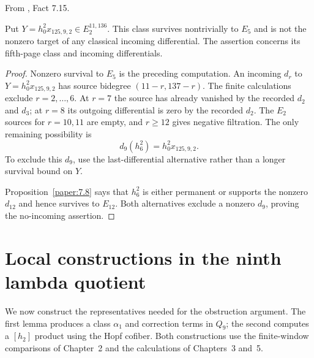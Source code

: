 \begin{fact}
\label{paper:7.15}
From \cite{LWX126}, Fact 7.15.\par

\label{fact:h_0_sq_mul_x_125_9_2}\label{fact:h02x1259}
Put $Y=h_0^2x_{125,9,2}\in E_2^{11,136}$. This class survives
nontrivially to $E_5$ and is not the nonzero target of any classical
incoming differential. The assertion concerns its fifth-page class and incoming differentials.

\end{fact}
\begin{proof}
Nonzero survival to $E_5$ is the preceding computation. An incoming $d_r$ to $Y=h_0^2x_{125,9,2}$ has source bidegree $(11-r,137-r)$. The finite calculations exclude $r=2,\ldots,6$. At $r=7$ the source has already vanished by the recorded $d_2$ and $d_3$; at $r=8$ its outgoing differential is zero by the recorded $d_2$. The $E_2$ sources for $r=10,11$ are empty, and $r\ge12$ gives negative filtration. The only remaining possibility is
\[
 d_9(h_6^2)=h_0^2x_{125,9,2}.
\]
To exclude this $d_9$, use the last-differential alternative rather
than a longer survival bound on $Y$.

Proposition~\ref{paper:7.8} says that $h_6^2$ is either permanent or
supports the nonzero $d_{12}$ and hence survives to $E_{12}$. Both
alternatives exclude a nonzero $d_9$, proving the no-incoming
assertion.
\end{proof}

\section{Local constructions in the ninth lambda quotient}

We now construct the representatives needed for the obstruction
argument. The first lemma produces a class $\alpha_1$ and correction
terms in $Q_9$; the second computes a $[h_2]$ product using the Hopf
cofiber. Both constructions use the finite-window comparisons of
Chapter~2 and the calculations of Chapters~3 and~5.

